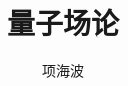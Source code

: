 \documentclass[UTF8,a4paper]{article}
\begin{document}
\begin{CJK*}{GBK}{}
\title{量子场论}
\author{项海波}
\maketitle
\thispagestyle{empty}%

\newpage
{}
\tableofcontents
\newpage
\listoffigures
\newpage
\listoftables
\newpage
{}


\newpage
\newpage
\newpage
\newpage
\newpage
\newpage
\newpage
\newpage
\newpage
\newpage



\end{CJK*}
\end{document}
